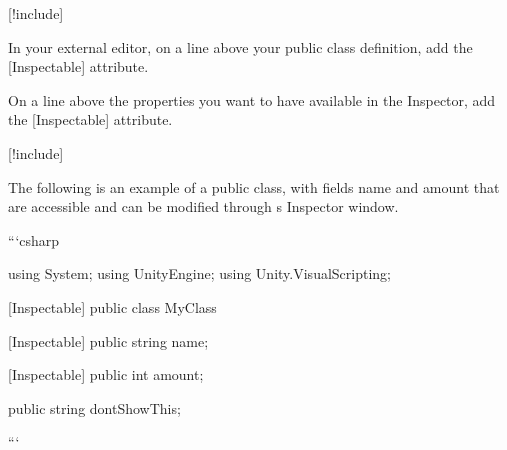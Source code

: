 \begin{DoxyEnumerate}
\item \mbox{[}!include\mbox{]}
\item In your external editor, on a line above your {\ttfamily public class} definition, add the {\ttfamily \mbox{[}Inspectable\mbox{]}} attribute.
\end{DoxyEnumerate}
\begin{DoxyEnumerate}
\item On a line above the properties you want to have available in the  Inspector, add the {\ttfamily \mbox{[}Inspectable\mbox{]}} attribute.
\end{DoxyEnumerate}
\begin{DoxyEnumerate}
\item \mbox{[}!include\mbox{]}
\end{DoxyEnumerate}

The following is an example of a public class, with fields {\ttfamily name} and {\ttfamily amount} that are accessible and can be modified through \textquotesingle{}s Inspector window. \begin{DoxyVerb}```csharp

using System;
using UnityEngine; 
using Unity.VisualScripting;

[Inspectable]
public class MyClass
{
    [Inspectable]
    public string name;

    [Inspectable]
    public int amount;

    public string dontShowThis;
}

```
\end{DoxyVerb}
 
